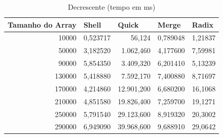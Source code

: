 \documentclass[a4paper, 12pt]{article}
\begin{document}
\begin{longtable}[c]{@{}rrrrr@{}}
	\caption{Decrescente (tempo em ms)}
	\label{tab:decrescente2-table}\\
	\toprule
	\multicolumn{1}{l}{\textbf{Tamanho do Array}} & \multicolumn{1}{l}{\textbf{Shell}} & \multicolumn{1}{l}{\textbf{Quick}} & \multicolumn{1}{l}{\textbf{Merge}} & \multicolumn{1}{l}{\textbf{Radix}} \\* \midrule
	\endfirsthead
	\endhead
	\multicolumn{1}{|r|}{10000}                   & \multicolumn{1}{r|}{0,523717}      & \multicolumn{1}{r|}{56,124}        & \multicolumn{1}{r|}{0,789048}      & \multicolumn{1}{r|}{1,21837}       \\* \midrule
	\multicolumn{1}{|r|}{50000}                   & \multicolumn{1}{r|}{3,182520}      & \multicolumn{1}{r|}{1.062,460}     & \multicolumn{1}{r|}{4,177600}      & \multicolumn{1}{r|}{7,59981}       \\* \midrule
	\multicolumn{1}{|r|}{90000}                   & \multicolumn{1}{r|}{5,854350}      & \multicolumn{1}{r|}{3.409,320}     & \multicolumn{1}{r|}{6,201410}      & \multicolumn{1}{r|}{5,13239}       \\* \midrule
	\multicolumn{1}{|r|}{130000}                  & \multicolumn{1}{r|}{5,418880}      & \multicolumn{1}{r|}{7.592,170}     & \multicolumn{1}{r|}{7,400880}      & \multicolumn{1}{r|}{8,71697}       \\* \midrule
	\multicolumn{1}{|r|}{170000}                  & \multicolumn{1}{r|}{4,214860}      & \multicolumn{1}{r|}{12.901,200}    & \multicolumn{1}{r|}{6,680200}      & \multicolumn{1}{r|}{16,1068}       \\* \midrule
	\multicolumn{1}{|r|}{210000}                  & \multicolumn{1}{r|}{4,851580}      & \multicolumn{1}{r|}{19.826,400}    & \multicolumn{1}{r|}{7,259700}      & \multicolumn{1}{r|}{19,1271}       \\* \midrule
	\multicolumn{1}{|r|}{250000}                  & \multicolumn{1}{r|}{5,791540}      & \multicolumn{1}{r|}{29.123,600}    & \multicolumn{1}{r|}{8,919320}      & \multicolumn{1}{r|}{20,3002}       \\* \midrule
	\multicolumn{1}{|r|}{290000}                  & \multicolumn{1}{r|}{6,949090}      & \multicolumn{1}{r|}{39.968,600}    & \multicolumn{1}{r|}{9,688910}      & \multicolumn{1}{r|}{29,0642}       \\* \midrule

\end{longtable}
\end{document}
